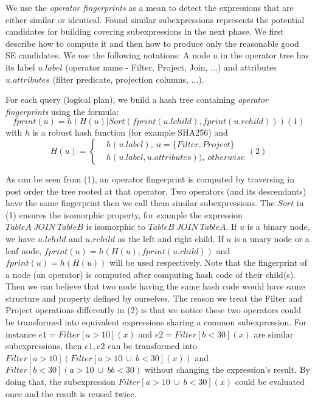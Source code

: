 We use the \emph{operator fingerprints} as a mean to detect the expressions that are either similar or identical. Found similar subexpressions represents the potential candidates for building covering subexpressions in the next phase. We first describe how to compute it and then how to produce only the reasonable good SE candidates. We use the following notations: A node $u$ in the operator tree has its label $u.label$ (operator name - Filter, Project, Join, ...) and attributes $u.attributes$ (filter predicate, projection columns, ...).


For each query (logical plan), we build a hash tree containing \emph{operator fingerprints} using the formula:
\[fprint(u)= h(H(u) | Sort(fprint(u.lchild), fprint(u.rchild))) (1)\]
with $h$ is a robust hash function (for example SHA256) and 
\[H(u)=
\begin{cases}
 & h(u.label),\ u= \{Filter, Project\}\\ 
 & h(u.label, u.attributes)),\ otherwise
\end{cases} (2)\]

As can be seen from (1), an operator fingerprint is computed by traversing in post order the tree rooted at that operator. Two operators (and its descendants) have the same fingerprint then we call them similar subexpressions. The $Sort$ in (1) ensures the isomorphic property, for example the expression $TableA\ JOIN\ TableB$ is isomorphic to $TableB\ JOIN\ TableA$. If $u$ is a binary node, we have $u.lchild$ and $u.rchild$ as the left and right child. If $u$ is a unary node or a leaf node, $fprint(u)= h(H(u), fprint(u.child))$ and $fprint(u)= h(H(u))$ will be used respectively. Note that the fingerprint of a node (an operator) is computed after computing hash code of their child(s). Then we can believe that two node having the same hash code would have same structure and property defined by ourselves. The reason we treat the Filter and Project operations differently in (2) is that we notice these two operators could be transformed into equivalent expressions sharing a common subexpression. For instance $e1 = Filter[a>10](x)$ and $e2 = Filter[b<30](x)$ are similar subexpressions, then $e1, e2$ can be transformed into $Filter[a>10](Filter[a>10\ \cup \ b < 30](x))$ and $Filter[b<30](a>10\ \cup \ b b < 30)$ without changing the expression's result. By doing that, the subexpression $Filter[a>10\ \cup \ b < 30](x)$ could be evaluated once and the result is reused twice.

